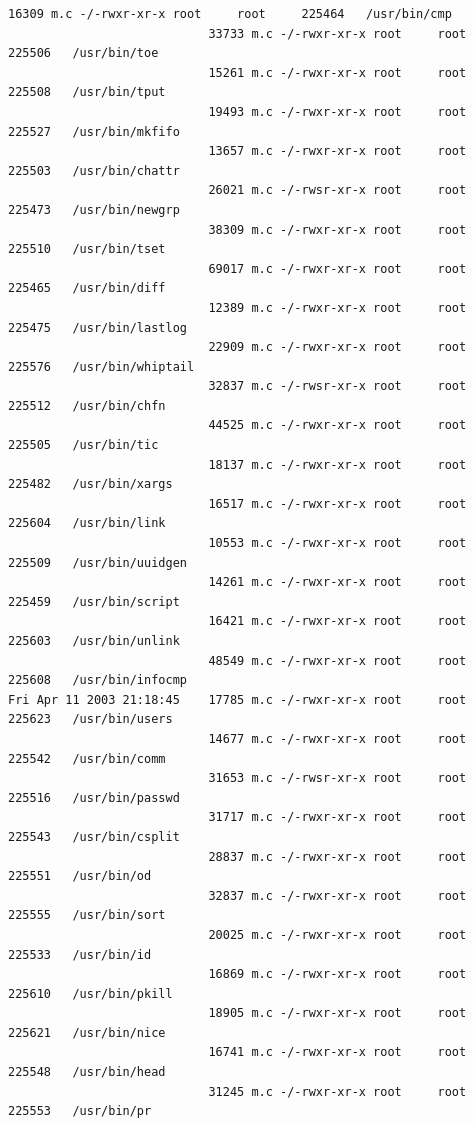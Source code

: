 {\begin{lstlisting}[style=terminal]
                            16309 m.c -/-rwxr-xr-x root     root     225464   /usr/bin/cmp
                            33733 m.c -/-rwxr-xr-x root     root     225506   /usr/bin/toe
                            15261 m.c -/-rwxr-xr-x root     root     225508   /usr/bin/tput
                            19493 m.c -/-rwxr-xr-x root     root     225527   /usr/bin/mkfifo
                            13657 m.c -/-rwxr-xr-x root     root     225503   /usr/bin/chattr
                            26021 m.c -/-rwsr-xr-x root     root     225473   /usr/bin/newgrp
                            38309 m.c -/-rwxr-xr-x root     root     225510   /usr/bin/tset
                            69017 m.c -/-rwxr-xr-x root     root     225465   /usr/bin/diff
                            12389 m.c -/-rwxr-xr-x root     root     225475   /usr/bin/lastlog
                            22909 m.c -/-rwxr-xr-x root     root     225576   /usr/bin/whiptail
                            32837 m.c -/-rwsr-xr-x root     root     225512   /usr/bin/chfn
                            44525 m.c -/-rwxr-xr-x root     root     225505   /usr/bin/tic
                            18137 m.c -/-rwxr-xr-x root     root     225482   /usr/bin/xargs
                            16517 m.c -/-rwxr-xr-x root     root     225604   /usr/bin/link
                            10553 m.c -/-rwxr-xr-x root     root     225509   /usr/bin/uuidgen
                            14261 m.c -/-rwxr-xr-x root     root     225459   /usr/bin/script
                            16421 m.c -/-rwxr-xr-x root     root     225603   /usr/bin/unlink
                            48549 m.c -/-rwxr-xr-x root     root     225608   /usr/bin/infocmp
Fri Apr 11 2003 21:18:45    17785 m.c -/-rwxr-xr-x root     root     225623   /usr/bin/users
                            14677 m.c -/-rwxr-xr-x root     root     225542   /usr/bin/comm
                            31653 m.c -/-rwsr-xr-x root     root     225516   /usr/bin/passwd
                            31717 m.c -/-rwxr-xr-x root     root     225543   /usr/bin/csplit
                            28837 m.c -/-rwxr-xr-x root     root     225551   /usr/bin/od
                            32837 m.c -/-rwxr-xr-x root     root     225555   /usr/bin/sort
                            20025 m.c -/-rwxr-xr-x root     root     225533   /usr/bin/id
                            16869 m.c -/-rwxr-xr-x root     root     225610   /usr/bin/pkill
                            18905 m.c -/-rwxr-xr-x root     root     225621   /usr/bin/nice
                            16741 m.c -/-rwxr-xr-x root     root     225548   /usr/bin/head
                            31245 m.c -/-rwxr-xr-x root     root     225553   /usr/bin/pr

\end{lstlisting}}
